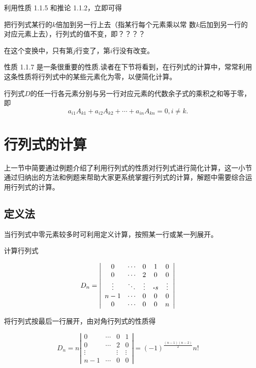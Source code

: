 利用性质 1.1.5 和推论 1.1.2，立即可得

\begin{property}
    把行列式某行的$k$倍加到另一行上去（指某行每个元素乘以常
    数$k$后加到另一行的对应元素上去），行列式的值不变，即？？？？
\end{property}

\begin{remark}
    在这个变换中，只有第$j$行变了，第$i$行没有改变。
\end{remark}

性质 1.1.7 是一条很重要的性质.读者在下节将看到，在行列式的计算中，常常利用这条性质将行列式中的某些元素化为零，以便简化计算。

\begin{property}
    行列式$D$的任一行各元素分别与另一行对应元素的代数余子式的乘积之和等于零，即
    $$ a_{i1}A_{k1}+a_{i2}A_{k2} +\cdots +a_{in}A_{kn}= 0,  i\ne k.  $$
\end{property}


\section{行列式的计算}

上一节中简要通过例题介绍了利用行列式的性质对行列式进行简化计算，这一小节通过归纳出的方法和例题来帮助大家更系统掌握行列式的计算，解题中需要综合运用行列式的计算。
\subsection{定义法}

当行列式中零元素较多时可利用定义计算，按照某一行或某一列展开。

\begin{example}
    计算行列式

$$D_{n}= \left|\begin{array}{ccccc}
        0      & \cdots & 0      & 1      & 0      \\
        0      & \cdots & 2      & 0      & 0      \\
        \vdots & \ddots   & \vdots & \vdot    s & \vdots \\
        n-1    & \cdots & 0      & 0      & 0      \\
        0      & \cdots & 0      & 0      & n      \\
    \end{array}\right|$$
\end{example}
\begin{solution}
    将行列式按最后一行展开，由对角行列式的性质得

$$D_{n}=n \left|\begin{array}{cccc}
        0      & \cdots & 0      & 1      \\
        0      & \cdots & 2      & 0      \\
        \vdots &        & \vdots & \vdots \\
        n-1    & \cdots & 0      & 0
    \end{array}\right|=(-1)^{\frac{(n-1)(n-2)}{2}}n!$$
\end{solution}

